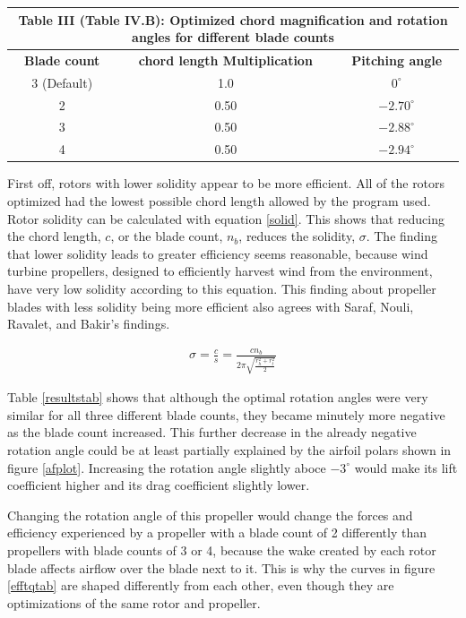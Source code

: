 \documentclass[journal ]{new-aiaa}
\begin{document}
\begin{center}
\label{resultstab}
\begin{tabular}{| c | c | c |}
	 \multicolumn{3}{c}{Table III (Table IV.B): Optimized chord magnification and rotation angles for different blade counts}  \\ \hline
  	 \textbf{Blade count} & \textbf{chord length Multiplication} & \textbf{Pitching angle} \\ \hline
  	 3 (Default) & 1.0 & $0^{\circ}$ \\ \hline
  	 2 & 0.50 & $-2.70^{\circ}$ \\ \hline
  	 3 & 0.50 & $-2.88^{\circ}$ \\ \hline
  	 4 & 0.50 & $-2.94^{\circ}$ \\ \hline
\end{tabular}
\end{center}

First off, rotors with lower solidity appear to be more efficient. All of the rotors optimized had the lowest possible chord length allowed by the program used. Rotor solidity can be calculated with equation \ref{solid}. This shows that reducing the chord length, $c$, or the blade count, $n_{b}$, reduces the solidity, $\sigma$. The finding that lower solidity leads to greater efficiency seems reasonable, because wind turbine propellers, designed to efficiently harvest wind from the environment, have very low solidity according to this equation. This finding about propeller blades with less solidity being more efficient also agrees with Saraf, Nouli, Ravalet, and Bakir's findings. \cite{AxFlFan}

\begin{equation}
	\begin{aligned}
	\label{solid}
	\sigma = \frac{c}{s} = \frac{c n_{b}}{2 \pi \sqrt{\frac{r_{h}^{2}+r_{t}^{2}}{2}}}
\end{aligned}
\end{equation}

Table \ref{resultstab} shows that although the optimal rotation angles were very similar for all three different blade counts, they became minutely more negative as the blade count increased. This further decrease in the already negative rotation angle could be at least partially explained by the airfoil polars shown in figure \ref{afplot}. Increasing the rotation angle slightly aboce $-3^{\circ}$ would make its lift coefficient higher and its drag coefficient slightly lower. 

Changing the rotation angle of this propeller would change the forces and efficiency experienced by a propeller with a blade count of 2 differently than propellers with blade counts of 3 or 4, because the wake created by each rotor blade affects airflow over the blade next to it. This is why the curves in figure \ref{efftqtab} are shaped differently from each other, even though they are optimizations of the same rotor and propeller.
\end{document}
